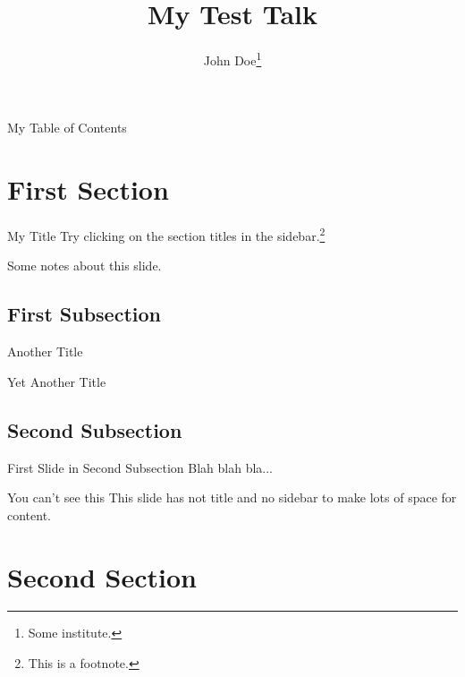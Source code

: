 \documentclass[12pt,screen]{talk}
\title{My Test Talk}
\author[John Doe]{John Doe\thanks{Some institute.}}
\begin{document}
\maketitleslide

\begin{slide}[outline]{My Table of Contents}
  \tableofcontents
\end{slide}

\section{First Section}

\begin{slide}{My Title}
  Try clicking on the section titles in the sidebar.\footnote{This is a
  footnote.}
\end{slide}
\begin{notes}
  Some notes about this slide.
\end{notes}

\subsection{First Subsection}

\begin{slide}{Another Title}
\end{slide}

\begin{slide}[nosidebar]{Yet Another Title}
\end{slide}

\subsection{Second Subsection}

\begin{slide}{First Slide in Second Subsection}
  Blah blah bla...
\end{slide}

\begin{slide}[notitle]{You can't see this}
  This slide has not title and no sidebar to make lots of space for content.
\end{slide}

\section{Second Section}
\end{document}
